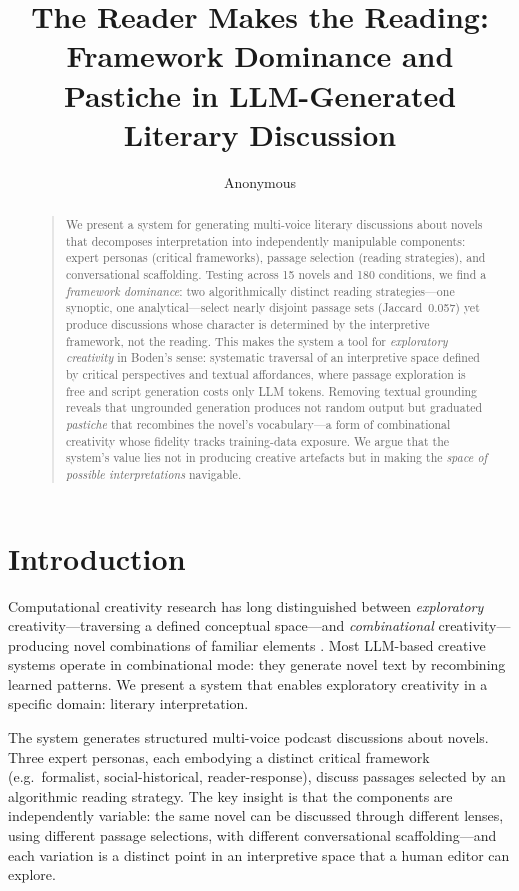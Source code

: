 \documentclass[letterpaper]{article}
\title{The Reader Makes the Reading:\\
Framework Dominance and Pastiche in LLM-Generated Literary Discussion}
\author{Anonymous}
\begin{document}
\maketitle
\begin{abstract}
\begin{quote}
We present a system for generating multi-voice literary discussions
about novels that decomposes interpretation into independently
manipulable components: expert personas (critical frameworks),
passage selection (reading strategies), and conversational
scaffolding.  Testing across 15 novels and 180 conditions, we find a
\emph{framework dominance}: two algorithmically distinct reading
strategies---one synoptic, one analytical---select nearly disjoint
passage sets (Jaccard~0.057) yet produce discussions whose character
is determined by the interpretive framework, not the reading.  This
makes the system a tool for \emph{exploratory creativity} in Boden's
sense: systematic traversal of an interpretive space defined by
critical perspectives and textual affordances, where passage exploration is free and script generation costs only
LLM tokens.  Removing textual grounding reveals that ungrounded
generation produces not random output but graduated \emph{pastiche}
that recombines the novel's vocabulary---a form of combinational
creativity whose fidelity tracks training-data exposure.  We argue
that the system's value lies not in producing creative artefacts but
in making the \emph{space of possible interpretations} navigable.
\end{quote}
\end{abstract}

\section{Introduction}

Computational creativity research has long distinguished between
\emph{exploratory} creativity---traversing a defined conceptual
space---and \emph{combinational} creativity---producing novel
combinations of familiar elements \cite{boden2004creative}.  Most
LLM-based creative systems operate in combinational mode: they
generate novel text by recombining learned patterns.  We present a
system that enables exploratory creativity in a specific domain:
literary interpretation.

The system generates structured multi-voice podcast discussions about
novels.  Three expert personas, each embodying a distinct critical
framework (e.g.\ formalist, social-historical, reader-response),
discuss passages selected by an algorithmic reading strategy.  The key
insight is that the components are independently variable: the same
novel can be discussed through different lenses, using different
passage selections, with different conversational scaffolding---and
each variation is a distinct point in an interpretive space that a
human editor can explore.
\end{document}

